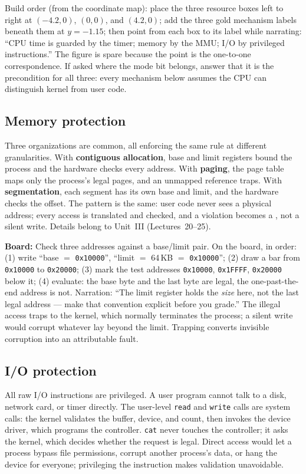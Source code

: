 \documentclass[11pt]{article}
\begin{document}
Build order (from the coordinate map): place the three resource boxes left to right at $(-4.2,0)$, $(0,0)$, and $(4.2,0)$; add the three gold mechanism labels beneath them at $y=-1.15$; then point from each box to its label while narrating: ``CPU time is guarded by the timer; memory by the MMU; I/O by privileged instructions.'' The figure is spare because the point is the one-to-one correspondence. If asked where the mode bit belongs, answer that it is the precondition for all three: every mechanism below assumes the CPU can distinguish kernel from user code.

\subsection*{Memory protection}

Three organizations are common, all enforcing the same rule at different granularities. With \textbf{contiguous allocation}, base and limit registers bound the process and the hardware checks every address. With \textbf{paging}, the page table maps only the process's legal pages, and an unmapped reference traps. With \textbf{segmentation}, each segment has its own base and limit, and the hardware checks the offset. The pattern is the same: user code never sees a physical address; every access is translated and checked, and a violation becomes a , not a silent write. Details belong to Unit~III (Lectures~20--25).

\noindent\textbf{Board:} Check three addresses against a base/limit pair. On the board, in order: (1) write ``base $=$ \texttt{0x10000}'', ``limit $=$ 64\,KB $=$ \texttt{0x10000}''; (2) draw a bar from \texttt{0x10000} to \texttt{0x20000}; (3) mark the test addresses \texttt{0x10000}, \texttt{0x1FFFF}, \texttt{0x20000} below it; (4) evaluate: the base byte and the last byte are legal, the one-past-the-end address is not. Narration: ``The limit register holds the \emph{size} here, not the last legal address --- make that convention explicit before you grade.'' The illegal access traps to the kernel, which normally terminates the process; a silent write would corrupt whatever lay beyond the limit. Trapping converts invisible corruption into an attributable fault.

\subsection*{I/O protection}

All raw I/O instructions are privileged. A user program cannot talk to a disk, network card, or timer directly. The user-level \texttt{read} and \texttt{write} calls are system calls: the kernel validates the buffer, device, and count, then invokes the device driver, which programs the controller. \texttt{cat} never touches the controller; it asks the kernel, which decides whether the request is legal. Direct access would let a process bypass file permissions, corrupt another process's data, or hang the device for everyone; privileging the instruction makes validation unavoidable.
\end{document}
